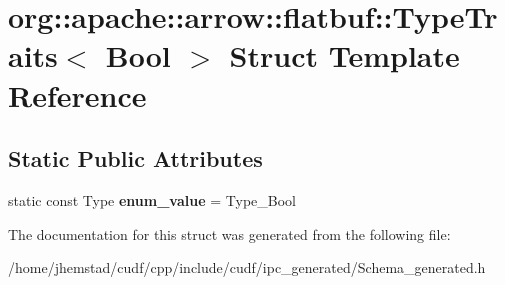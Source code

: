 \hypertarget{structorg_1_1apache_1_1arrow_1_1flatbuf_1_1TypeTraits_3_01Bool_01_4}{}\section{org\+:\+:apache\+:\+:arrow\+:\+:flatbuf\+:\+:Type\+Traits$<$ Bool $>$ Struct Template Reference}
\label{structorg_1_1apache_1_1arrow_1_1flatbuf_1_1TypeTraits_3_01Bool_01_4}
\subsection*{Static Public Attributes}
\begin{DoxyCompactItemize}
\item 
static const Type {\bfseries enum\+\_\+value} = Type\+\_\+\+Bool\hypertarget{structorg_1_1apache_1_1arrow_1_1flatbuf_1_1TypeTraits_3_01Bool_01_4_a29092220276ef05480493643b4ff510a}{}\label{structorg_1_1apache_1_1arrow_1_1flatbuf_1_1TypeTraits_3_01Bool_01_4_a29092220276ef05480493643b4ff510a}

\end{DoxyCompactItemize}


The documentation for this struct was generated from the following file\+:\begin{DoxyCompactItemize}
\item 
/home/jhemstad/cudf/cpp/include/cudf/ipc\+\_\+generated/Schema\+\_\+generated.\+h\end{DoxyCompactItemize}
